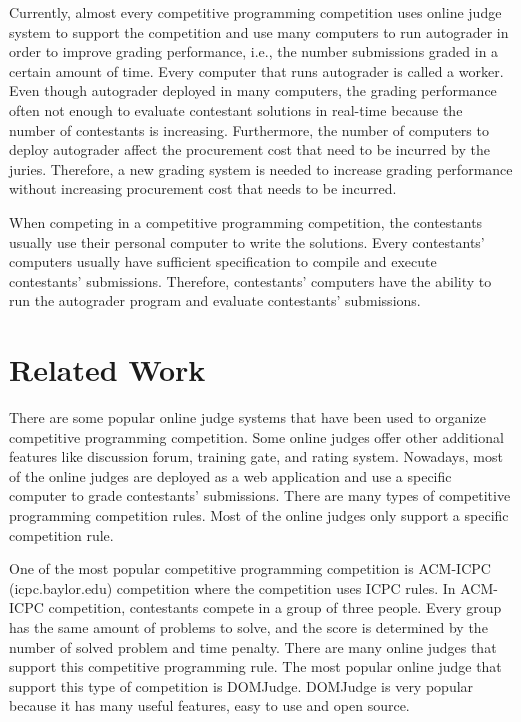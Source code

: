 \documentclass[conference,a4paper]{IEEEtran}
\begin{document}
Currently, almost every competitive programming competition uses online judge system to support the competition and use many computers to run autograder in order to improve grading performance, i.e., the number submissions graded in a certain amount of time. Every computer that runs autograder is called a worker. Even though autograder deployed in many computers, the grading performance often not enough to evaluate contestant solutions in real-time because the number of contestants is increasing. Furthermore, the number of computers to deploy autograder affect the procurement cost that need to be incurred by the juries. Therefore, a new grading system is needed to increase grading performance without increasing procurement cost that needs to be incurred.

When competing in a competitive programming competition, the contestants usually use their personal computer to write the solutions. Every contestants' computers usually have sufficient specification to compile and execute contestants' submissions. Therefore, contestants' computers have the ability to run the autograder program and evaluate contestants' submissions.

\section{Related Work}

There are some popular online judge systems that have been used to organize competitive programming competition. Some online judges offer other additional features like discussion forum, training gate, and rating system. Nowadays, most of the online judges are deployed as a web application and use a specific computer to grade contestants' submissions. There are many types of competitive programming competition rules. Most of the online judges only support a specific competition rule.

One of the most popular competitive programming competition is ACM-ICPC (icpc.baylor.edu) competition where the competition uses ICPC rules. In ACM-ICPC competition, contestants compete in a group of three people. Every group has the same amount of problems to solve, and the score is determined by the number of solved problem and time penalty. There are many online judges that support this competitive programming rule. The most popular online judge that support this type of competition is DOMJudge. DOMJudge is very popular because it has many useful features, easy to use and open source.
\end{document}
